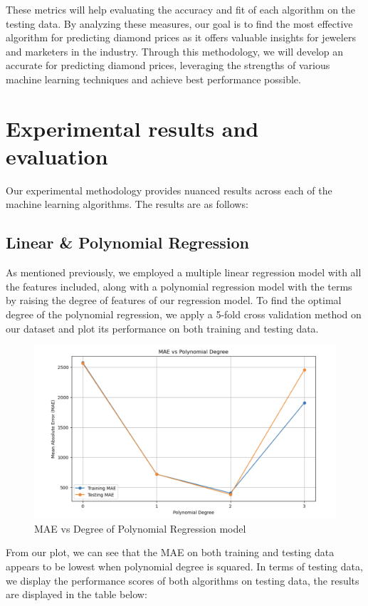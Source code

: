 \documentclass[conference]{IEEEtran}
\begin{document}
These metrics will help evaluating the accuracy and fit of each algorithm on the testing data. By analyzing these measures, our goal is to find the most effective algorithm for predicting diamond prices as it offers valuable insights for jewelers and marketers in the industry. Through this methodology, we will develop an accurate for predicting diamond prices, leveraging the strengths of various machine learning techniques and achieve best performance possible.

\section{Experimental results and evaluation}

Our experimental methodology provides nuanced results across each of the machine learning algorithms. The results are as follows: 

\subsection{Linear \& Polynomial Regression}

As mentioned previously, we employed a multiple linear regression model with all the features included, along with a polynomial regression model with the terms by raising the degree of features of our regression model. To find the optimal degree of the polynomial regression, we apply a 5-fold cross validation method on our dataset and plot its performance on both training and testing data. 

\begin{figure}[H]
    \centering
    \includegraphics[width=0.8\linewidth]{mae_poly.png} %
    \caption{MAE vs Degree of Polynomial Regression model}
    \label{fig:boxplots}
\end{figure}

From our plot, we can see that the MAE on both training and testing data appears to be lowest when polynomial degree is squared. In terms of testing data, we display the performance scores of both algorithms on testing data, the results are displayed in the table below:
\end{document}
